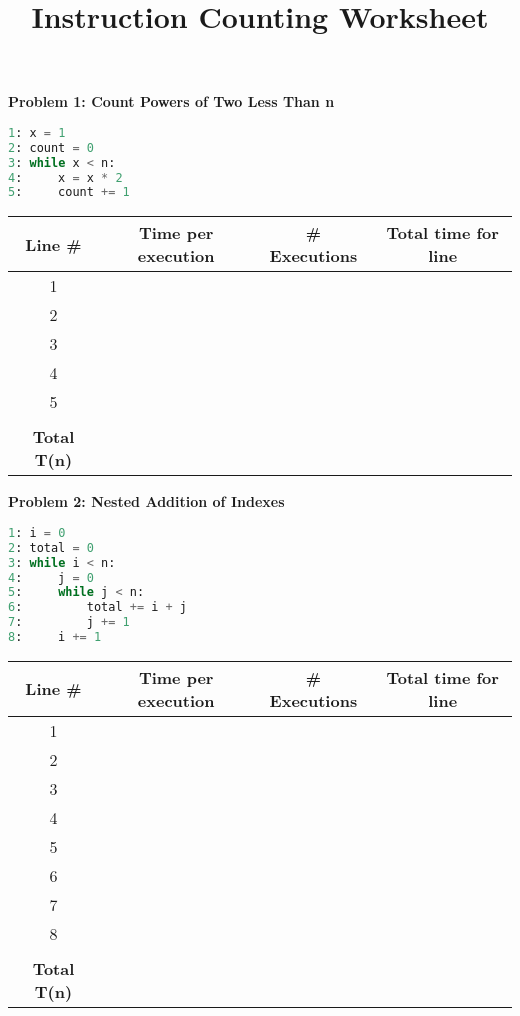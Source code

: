 \documentclass[11pt]{article}
\title{Instruction Counting Worksheet}
\date{}
\newenvironment{problem}{\vspace{1em}\noindent}{\vspace{2em}}
\begin{document}
\maketitle

\begin{problem}
\textbf{Problem 1: Count Powers of Two Less Than n}

\begin{lstlisting}[language=Python]
1: x = 1
2: count = 0
3: while x < n:
4:     x = x * 2
5:     count += 1
\end{lstlisting}

\begin{tabular}{|c|c|c|c|}
\hline
Line \# & Time per execution & \# Executions & Total time for line \\
\hline
1 & & & \\
2 & & & \\
3 & & & \\
4 & & & \\
5 & & & \\
\hline
 & & & \\
\textbf{Total T(n)} & & & \\
\hline
\end{tabular}
\end{problem}

\begin{problem}
\textbf{Problem 2: Nested Addition of Indexes}

\begin{lstlisting}[language=Python]
1: i = 0
2: total = 0
3: while i < n:
4:     j = 0
5:     while j < n:
6:         total += i + j
7:         j += 1
8:     i += 1
\end{lstlisting}

\begin{tabular}{|c|c|c|c|}
\hline
Line \# & Time per execution & \# Executions & Total time for line \\
\hline
1 & & & \\
2 & & & \\
3 & & & \\
4 & & & \\
5 & & & \\
6 & & & \\
7 & & & \\
8 & & & \\
\hline
 & & & \\
\textbf{Total T(n)} & & & \\
\hline
\end{tabular}
\end{problem}
\end{document}
